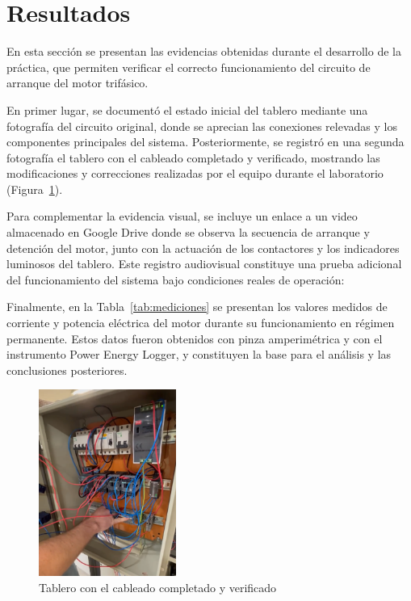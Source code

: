 \section{Resultados}

En esta sección se presentan las evidencias obtenidas durante el desarrollo de la práctica, que permiten verificar el correcto funcionamiento del circuito de arranque del motor trifásico.

En primer lugar, se documentó el estado inicial del tablero mediante una fotografía del circuito original, donde se aprecian las conexiones relevadas y los componentes principales del sistema. Posteriormente, se registró en una segunda fotografía el tablero con el cableado completado y verificado, mostrando las modificaciones y correcciones realizadas por el equipo durante el laboratorio (Figura~\ref{fig:circuito_completo}).

Para complementar la evidencia visual, se incluye un enlace a un video almacenado en Google Drive donde se observa la secuencia de arranque y detención del motor, junto con la actuación de los contactores y los indicadores luminosos del tablero. Este registro audiovisual constituye una prueba adicional del funcionamiento del sistema bajo condiciones reales de operación:


Finalmente, en la Tabla~\ref{tab:mediciones} se presentan los valores medidos de corriente y potencia eléctrica del motor durante su funcionamiento en régimen permanente. Estos datos fueron obtenidos con pinza amperimétrica y con el instrumento Power Energy Logger, y constituyen la base para el análisis y las conclusiones posteriores.


\begin{figure}[H]
\centering
\includegraphics[width=0.4\textwidth]{anexos/circuitoCompleto.png}
\caption{Tablero con el cableado completado y verificado}\label{fig:circuito_completo}
\end{figure}

